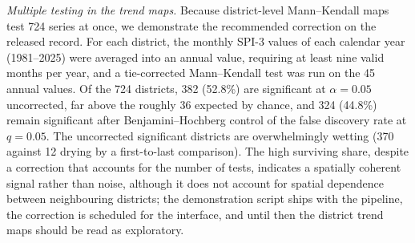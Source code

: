 \documentclass[10pt,a4paper]{article}
\begin{document}
\emph{Multiple testing in the trend maps.} Because district-level Mann--Kendall maps test 724 series at once, we demonstrate the recommended correction on the released record. For each district, the monthly SPI-3 values of each calendar year (1981--2025) were averaged into an annual value, requiring at least nine valid months per year, and a tie-corrected Mann--Kendall test was run on the 45 annual values. Of the 724 districts, 382 (52.8\%) are significant at $\alpha=0.05$ uncorrected, far above the roughly 36 expected by chance, and 324 (44.8\%) remain significant after Benjamini--Hochberg control of the false discovery rate at $q=0.05$. The uncorrected significant districts are overwhelmingly wetting (370 against 12 drying by a first-to-last comparison). The high surviving share, despite a correction that accounts for the number of tests, indicates a spatially coherent signal rather than noise, although it does not account for spatial dependence between neighbouring districts; the demonstration script ships with the pipeline, the correction is scheduled for the interface, and until then the district trend maps should be read as exploratory.
\end{document}
